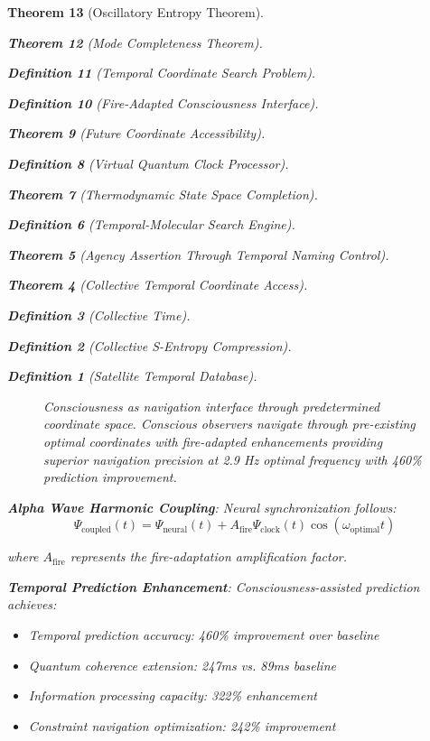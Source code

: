 \documentclass[12pt,a4paper]{article}
\newtheorem{theorem}{Theorem}[section]
\newtheorem{definition}[theorem]{Definition}
\begin{document}
\begin{theorem}[Oscillatory Entropy Theorem]
\begin{theorem}[Mode Completeness Theorem]
\begin{enumerate}
\begin{definition}[Temporal Coordinate Search Problem]
\begin{algorithm}
\begin{definition}[Fire-Adapted Consciousness Interface]
\begin{theorem}[Future Coordinate Accessibility]
\begin{definition}[Virtual Quantum Clock Processor]
\begin{itemize}
\begin{itemize}
\begin{theorem}[Thermodynamic State Space Completion]
\begin{definition}[Temporal-Molecular Search Engine]
\begin{theorem}[Agency Assertion Through Temporal Naming Control]
\begin{remark}
\begin{theorem}[Collective Temporal Coordinate Access]
\begin{definition}[Collective Time]
\begin{definition}[Collective S-Entropy Compression]
\begin{definition}[Satellite Temporal Database]
\begin{algorithm}
\begin{table}[h]
{\begin{figure}[h]
\caption{Consciousness as navigation interface through predetermined coordinate space. Conscious observers navigate through pre-existing optimal coordinates with fire-adapted enhancements providing superior navigation precision at 2.9 Hz optimal frequency with 460\% prediction improvement.}
\label{fig:consciousness_navigation}
\end{figure}

\textbf{Alpha Wave Harmonic Coupling}: Neural synchronization follows:
$$\Psi_{\text{coupled}}(t) = \Psi_{\text{neural}}(t) + A_{\text{fire}} \Psi_{\text{clock}}(t) \cos(\omega_{\text{optimal}} t)$$

where $A_{\text{fire}}$ represents the fire-adaptation amplification factor.

\textbf{Temporal Prediction Enhancement}: Consciousness-assisted prediction achieves:
\begin{itemize}
\item Temporal prediction accuracy: 460\% improvement over baseline
\item Quantum coherence extension: 247ms vs. 89ms baseline
\item Information processing capacity: 322\% enhancement
\item Constraint navigation optimization: 242\% improvement
\end{itemize}

}
\end{table}
\end{algorithm}
\end{definition}
\end{definition}
\end{definition}
\end{theorem}
\end{remark}
\end{theorem}
\end{definition}
\end{theorem}
\end{itemize}
\end{itemize}
\end{definition}
\end{theorem}
\end{definition}
\end{algorithm}
\end{definition}
\end{enumerate}
\end{theorem}
\end{theorem}
\end{document}
